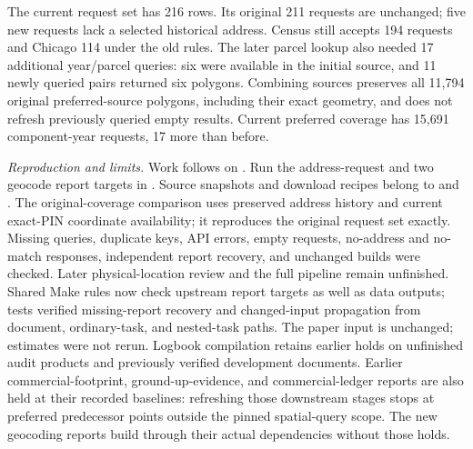 The current request set has 216 rows. Its original 211 requests are unchanged;
five new requests lack a selected historical address. Census still accepts 194
requests and Chicago 114 under the old rules. The later parcel lookup also needed
17 additional year/parcel queries: six were available in the initial source, and
11 newly queried pairs returned six polygons. Combining sources preserves all
11,794 original preferred-source polygons, including their exact geometry, and
does not refresh previously queried empty results. Current preferred coverage has
15,691 component-year requests, 17 more than before.

\textit{Reproduction and limits.} Work follows  on
. Run the address-request and two geocode report
targets in . Source snapshots and
download recipes belong to  and
. The original-coverage comparison
uses preserved address history and current exact-PIN coordinate availability;
it reproduces the original request set exactly. Missing queries, duplicate keys,
API errors, empty requests, no-address and no-match responses, independent report
recovery, and unchanged builds were checked. Later physical-location review and
the full pipeline remain unfinished. Shared Make rules now check upstream report
targets as well as data outputs; tests verified missing-report recovery and
changed-input propagation from document, ordinary-task, and nested-task paths.
The paper input is unchanged; estimates were
not rerun. Logbook compilation retains earlier holds on unfinished audit products
and previously verified development documents. Earlier commercial-footprint,
ground-up-evidence, and commercial-ledger reports are also held at their recorded
baselines: refreshing those downstream stages stops at preferred predecessor
points outside the pinned spatial-query scope. The new geocoding reports build
through their actual dependencies without those holds.
